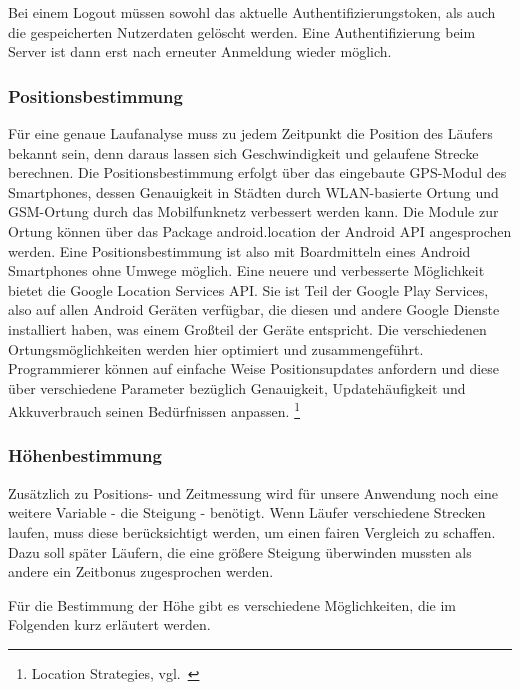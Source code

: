 Bei einem Logout müssen sowohl das aktuelle Authentifizierungstoken, als auch die gespeicherten Nutzerdaten gelöscht werden. Eine Authentifizierung beim Server ist dann erst nach erneuter Anmeldung wieder möglich.
\subsubsection{Positionsbestimmung}
Für eine genaue Laufanalyse muss zu jedem Zeitpunkt die Position des Läufers bekannt sein, denn daraus lassen sich Geschwindigkeit und gelaufene Strecke berechnen. Die Positionsbestimmung erfolgt über das eingebaute GPS-Modul des Smartphones, dessen Genauigkeit in Städten durch WLAN-basierte Ortung und GSM-Ortung durch das Mobilfunknetz verbessert werden kann. Die Module zur Ortung können über das Package android.location der Android API angesprochen werden. Eine Positionsbestimmung ist also mit Boardmitteln eines Android Smartphones ohne Umwege möglich. Eine neuere und verbesserte Möglichkeit bietet die Google Location Services API. Sie ist Teil der Google Play Services, also auf allen Android Geräten verfügbar, die diesen und andere Google Dienste installiert haben, was einem Großteil der Geräte entspricht. Die verschiedenen Ortungsmöglichkeiten werden hier optimiert und zusammengeführt. Programmierer können auf einfache Weise Positionsupdates anfordern und diese über verschiedene Parameter bezüglich Genauigkeit, Updatehäufigkeit und Akkuverbrauch seinen Bedürfnissen anpassen. \footnote{Location Strategies, vgl.~\cite{androidlocation}}
\subsubsection{Höhenbestimmung}
Zusätzlich zu Positions- und Zeitmessung wird für unsere Anwendung noch eine weitere Variable - die Steigung - benötigt. Wenn Läufer verschiedene Strecken laufen, muss diese berücksichtigt werden, um einen fairen Vergleich zu schaffen. Dazu soll später Läufern, die eine größere Steigung überwinden mussten als andere ein Zeitbonus zugesprochen werden.

Für die Bestimmung der Höhe gibt es verschiedene Möglichkeiten, die im Folgenden kurz erläutert werden.
